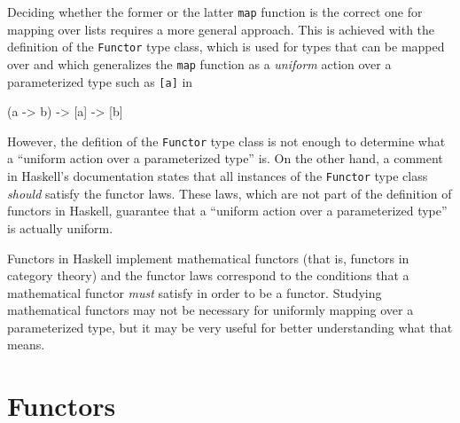 Deciding whether the former or the latter \texttt{map} function is the
correct one for mapping over lists requires a more general approach.
This is achieved with the definition of the \texttt{Functor} type
class, which is used for types that can be mapped over and which
generalizes the \texttt{map} function as a \emph{uniform} action over
a parameterized type such as \texttt{[a]} in
\begin{codehaskell}
  (a -> b) -> [a] -> [b]
\end{codehaskell}

However, the defition of the \texttt{Functor} type class is not enough
to determine what a ``uniform action over a parameterized type'' is.
On the other hand, a comment in Haskell's documentation states that
all instances of the \texttt{Functor} type class \emph{should} satisfy
the functor laws. These laws, which are not part of the definition of
functors in Haskell, guarantee that a ``uniform action over a
parameterized type'' is actually uniform.

Functors in Haskell implement mathematical functors (that is, functors
in category theory) and the functor laws correspond to the conditions
that a mathematical functor \emph{must} satisfy in order to be a
functor. Studying mathematical functors may not be necessary for
uniformly mapping over a parameterized type, but it may be very useful
for better understanding what that means.

\section{Functors}
\label{sec:functors}


